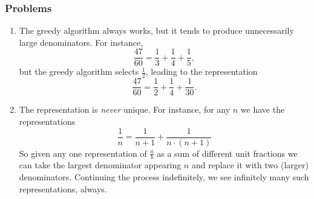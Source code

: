 \documentclass[12pt]{article}
\begin{document}
\subsubsection*{Problems}
\begin{enumerate}
\item
The greedy algorithm always works, but it tends to produce unnecessarily large denominators.  For instance, $$\frac{47}{60}=\frac{1}{3}+\frac{1}{4}+\frac{1}{5},$$
but the greedy algorithm selects $\frac{1}{2}$, leading to the representation
$$
\frac{47}{60}=\frac{1}{2}+\frac{1}{4}+\frac{1}{30}.
$$
\item
The representation is \emph{never} unique.  For instance, for any $n$ we have the representations
$$
\frac{1}{n} = \frac{1}{n+1} + \frac{1}{n\cdot(n+1)}
$$
So given any one representation of $\frac{a}{b}$ as a sum of different unit fractions we can take the largest denominator appearing $n$ and replace it with two (larger) denominators.  Continuing the process indefinitely, we see infinitely many such representations, always.
\end{enumerate}
\end{document}
